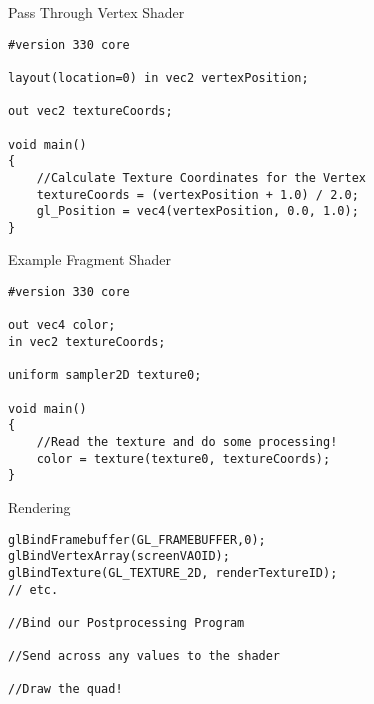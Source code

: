 \begin{frame}[fragile]{Pass Through Vertex Shader}
	\begin{lstlisting}
#version 330 core

layout(location=0) in vec2 vertexPosition;

out vec2 textureCoords;

void main()
{
	//Calculate Texture Coordinates for the Vertex
	textureCoords = (vertexPosition + 1.0) / 2.0;
	gl_Position = vec4(vertexPosition, 0.0, 1.0);
}
	\end{lstlisting}
\end{frame}

\begin{frame}[fragile]{Example Fragment Shader}
	\begin{lstlisting}
#version 330 core

out vec4 color;
in vec2 textureCoords;

uniform sampler2D texture0;

void main()
{
	//Read the texture and do some processing!
	color = texture(texture0, textureCoords);
}
	\end{lstlisting}
\end{frame}

\begin{frame}[fragile]{Rendering}
	\begin{lstlisting}
glBindFramebuffer(GL_FRAMEBUFFER,0);
glBindVertexArray(screenVAOID);
glBindTexture(GL_TEXTURE_2D, renderTextureID);
// etc.

//Bind our Postprocessing Program

//Send across any values to the shader

//Draw the quad!
	\end{lstlisting}
\end{frame}